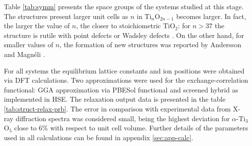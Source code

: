 Table \ref{tab:symm} presents the space groups of the systems studied at this stage. The structures present larger unit cells as $n$ in Ti$_n$O$_{2n-1}$ becomes larger. In fact, the larger the value of $n$, the closer to stoichiometric TiO$_2$: for $n > 37$ the structure is rutile with point defects or Wadsley defects \cite{Szot2011}. On the other hand, for smaller values of $n$, the formation of new structures was reported by Andersson and Magnéli \cite{Andersson1957}.

For all systems the equilibrium lattice constants and ion positions were obtained via DFT calculations. Two approximations were used for the exchange-correlation functional: GGA approximation via PBESol functional and screened hybrid as implemented in HSE. The relaxation output data is presented in the table \ref{tab:struct-relax-prb}. The error in comparison with experimental data from X-ray diffraction spectra was considered small, being the highest deviation for $\alpha$-Ti$_3$O$_5$ close to 6\% with respect to unit cell volume. Further details of the parameters used in all calculations can be found in appendix \ref{sec:app-calc}.
